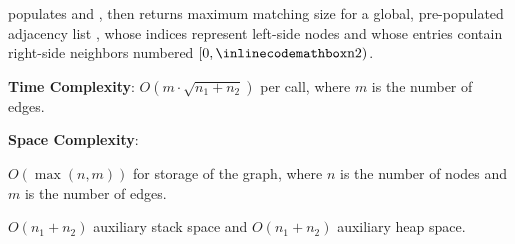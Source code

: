 \begin{compactitem}
  \item {} populates  and , then returns maximum matching size for a global, pre-populated adjacency list , whose indices represent left-side nodes and whose entries contain right-side neighbors numbered $[0, {\inlinecodemath{n2}})$.
\end{compactitem}

\textbf{Time Complexity}: $O(m \cdot \sqrt{n_1 + n_2})$ per call, where $m$ is the number of edges.

\textbf{Space Complexity}:
\begin{compactitem}
  \item $O(\max\left(n, m\right))$ for storage of the graph, where $n$ is the number of nodes and $m$ is the number of edges.
  \item $O(n_1 + n_2)$ auxiliary stack space and $O(n_1 + n_2)$ auxiliary heap space.
\end{compactitem}

